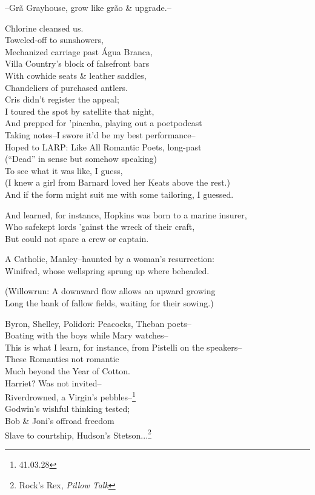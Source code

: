 
--Grã Grayhouse, grow like grão \& upgrade.--

Chlorine cleansed us. \\
Toweled-off to sunshowers, \\
Mechanized carriage past Água Branca, \\
Villa Country's block of falsefront bars \\
With cowhide seats \& leather saddles, \\
Chandeliers of purchased antlers. \\
Cris didn't register the appeal; \\ %
I toured the spot by satellite that night, \\
And prepped for 'piacaba, playing out a poetpodcast \\ 
Taking notes--I swore it'd be my best performance-- \\ %
Hoped to LARP: Like All Romantic Poets, long-past \\
(``Dead'' in sense but somehow speaking) \\ %
To see what it was like, I guess, \\
(I knew a girl from Barnard loved her Keats above the rest.) \\ 
And if the form might suit me with some tailoring, I guessed. %

And learned, for instance, Hopkins was born to a marine insurer, \\
Who safekept lords 'gainst the wreck of their craft, \\
But could not spare a crew or captain.

A Catholic, Manley--haunted by a woman's resurrection: \\
Winifred, whose wellspring sprung up where beheaded.

(Willowrun: A downward flow allows an upward growing \\
Long the bank of fallow fields, waiting for their sowing.)

Byron, Shelley, Polidori: Peacocks, Theban poets-- \\
Boating with the boys while Mary watches-- \\
This is what I learn, for instance, from Pistelli on the speakers-- \\
These Romantics not romantic \\
Much beyond the Year of Cotton. \\
Harriet? Was not invited-- \\
Riverdrowned, a Virgin's pebbles--\footnote{41.03.28} \\
Godwin's wishful thinking tested; \\
Bob \& Joni's offroad freedom \\
Slave to courtship, Hudson's Stetson...\footnote{Rock's Rex, \textit{Pillow Talk}}

